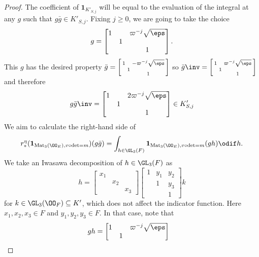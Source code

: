 \begin{proof}
  The coefficient of $\mathbf{1}_{K'_{S,j}}$ will be equal to
  the evaluation of the integral at any $g$ such that $g\bar{g} \in K'_{S,j}$.
  Fixing $j \ge 0$, we are going to take the choice
  \[
    g = \begin{bmatrix}
      1 &   & \varpi^{-j} \sqrt{\eps} \\
      & 1 \\
      &   & 1
    \end{bmatrix}.
  \]
  This $g$ has the desired property
  $\bar{g} = \left[ \begin{smallmatrix} 1 &   & -\varpi^{-j} \sqrt{\eps} \\ & 1 \\ &   & 1 \end{smallmatrix} \right]$
  so
  $\bar{g}\inv = \left[ \begin{smallmatrix} 1 &   & \varpi^{-j} \sqrt{\eps} \\ & 1 \\ &   & 1 \end{smallmatrix} \right]$
  and therefore
  \[
    g\bar{g}\inv = \begin{bmatrix}
      1 &   & 2\varpi^{-j} \sqrt{\eps} \\
      & 1 \\
      &   & 1
    \end{bmatrix} \in K'_{S,j}
  \]
  We aim to calculate the right-hand side of
  \[
    r_\ast^\eta(\mathbf{1}_{\Mat_3(\OO_E), v\circ\det=m})(g\bar{g})
    = \int_{h \in \GL_3(F)} \mathbf{1}_{\Mat_3(\OO_E), v\circ\det=m}(gh) \odif h.
  \]
  We take an Iwasawa decomposition of $h \in \GL_3(F)$ as
  \[
    h =
    \begin{bmatrix} x_1 \\ & x_2 \\ && x_3 \end{bmatrix}
    \begin{bmatrix} 1 & y_1 & y_2 \\ & 1 & y_3 \\ & & 1 \end{bmatrix}
    k
  \]
  for $k \in \GL_3(\OO_F) \subseteq K'$, which does not affect the indicator function.
  Here $x_1, x_2, x_3 \in F$ and $y_1, y_2, y_3 \in F$.
  In that case, note that
  \begin{align*}
    gh
    &=
    \begin{bmatrix}
      1 &   & \varpi^{-j}\sqrt\eps \\
      & 1 \\

\end{bmatrix}
\end{align*}
\end{proof}
